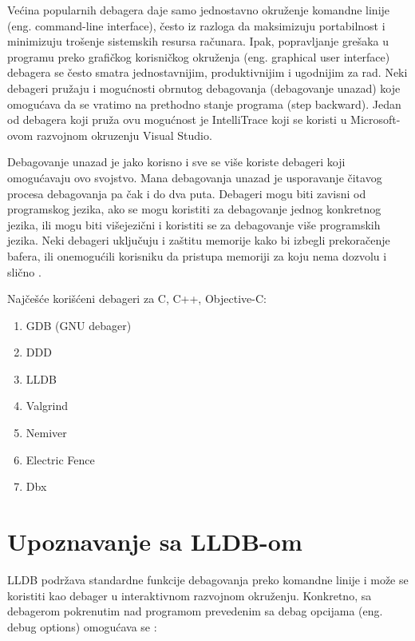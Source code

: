 \documentclass[a4paper]{article}
\begin{document}
Većina popularnih debagera daje samo jednostavno okruženje komandne linije (eng. command-line interface), često iz razloga da maksimizuju portabilnost i minimizuju trošenje sistemskih resursa računara. Ipak, popravljanje grešaka u programu preko grafičkog korisničkog okruženja (eng. graphical user interface) debagera se često smatra jednostavnijim, produktivnijim i ugodnijim za rad. Neki debageri pružaju i mogućnosti obrnutog debagovanja (debagovanje unazad) koje omogućava da se vratimo na prethodno stanje programa (step backward). Jedan od debagera koji pruža ovu mogućnost je IntelliTrace koji se koristi u Microsoft-ovom razvojnom okruzenju Visual Studio. 

Debagovanje unazad je jako korisno i sve se više koriste debageri koji omogućavaju ovo svojstvo. Mana debagovanja unazad je usporavanje čitavog procesa debagovanja pa čak i do dva puta. Debageri mogu biti zavisni od programskog jezika, ako se mogu koristiti za debagovanje jednog konkretnog jezika, ili mogu biti višejezični i koristiti se za debagovanje više programskih jezika. Neki debageri uključuju i zaštitu memorije kako bi izbegli prekoračenje bafera, ili onemogućili korisniku da pristupa memoriji za koju nema dozvolu i slično \cite{ssq_debug_def}.

Najčešće korišćeni debageri za  C, C++, Objective-C\cite{ll_best_debuggers}\cite{up_best_debuggers}:
\begin{enumerate}
	\item GDB (GNU debager)
	\item DDD
	\item LLDB
	\item Valgrind
	\item Nemiver
	\item Electric Fence
	\item Dbx
\end{enumerate}

\section{Upoznavanje sa LLDB-om}
LLDB podržava standardne funkcije debagovanja preko komandne linije i može se
koristiti kao debager u interaktivnom razvojnom okruženju. Konkretno, sa
debagerom pokrenutim nad programom prevedenim sa debag opcijama (eng. debug
options) omogućava se \cite{lldb_to_gdb_map}:
\end{document}
